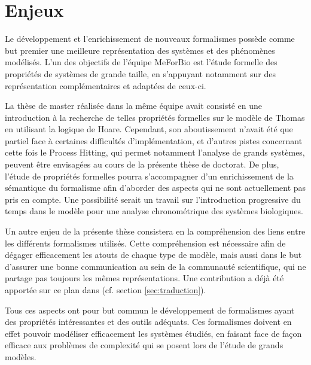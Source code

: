 \section{Enjeux}

Le développement et l'enrichissement de nouveaux formalismes possède comme but premier une meilleure représentation des systèmes et des phénomènes modélisés.
L'un des objectifs de l'équipe MeForBio est l'étude formelle des propriétés de systèmes de grande taille,
en s'appuyant notamment sur des représentation complémentaires et adaptées de ceux-ci.

La thèse de master \cite{Folschette2011} réalisée dans la même équipe avait consisté en une introduction à la recherche de telles propriétés formelles sur le modèle de Thomas en utilisant la logique de Hoare.
Cependant, son aboutissement n'avait été que partiel face à certaines difficultés d'implémentation,
et d'autres pistes concernant cette fois le Process Hitting, qui permet notamment l'analyse de grands systèmes, peuvent être envisagées au cours de la présente thèse de doctorat.
De plus, l'étude de propriétés formelles pourra s'accompagner d'un enrichissement de la sémantique du formalisme afin d'aborder des aspects qui ne sont actuellement pas pris en compte.
Une possibilité serait un travail sur l'introduction progressive du temps dans le modèle pour une analyse chronométrique des systèmes biologiques.


Un autre enjeu de la présente thèse consistera en la compréhension des liens entre les différents formalismes utilisés.
Cette compréhension est nécessaire afin de dégager efficacement les atouts de chaque type de modèle,
mais aussi dans le but d'assurer une bonne communication au sein de la communauté scientifique, qui ne partage pas toujours les mêmes représentations.
Une contribution a déjà été apportée sur ce plan dans \cite{FPIMR12-CMSB} (cf. section \ref{sec:traduction}).

Tous ces aspects ont pour but commun le développement de formalismes ayant des propriétés intéressantes et des outils adéquats.
Ces formalismes doivent en effet pouvoir modéliser efficacement les systèmes étudiés,
en faisant face de façon efficace aux problèmes de complexité qui se posent lors de l'étude de grands modèles.
